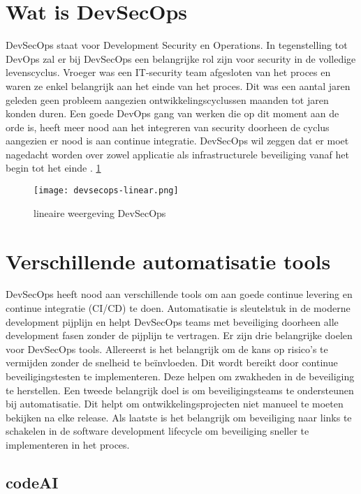\section{Wat is DevSecOps}

DevSecOps staat voor Development Security en Operations. In tegenstelling tot DevOps zal er bij DevSecOps een belangrijke rol zijn voor security in de volledige levenscyclus. Vroeger was een IT-security team afgesloten van het proces en waren ze enkel belangrijk aan het einde van het proces. Dit was een aantal jaren geleden geen probleem aangezien ontwikkelingscyclussen maanden tot jaren konden duren. Een goede DevOps gang van werken die op dit moment aan de orde is, heeft meer nood aan het integreren van security doorheen de cyclus aangezien er nood is aan continue integratie. DevSecOps wil zeggen dat er moet nagedacht worden over zowel applicatie als infrastructurele beveiliging vanaf het begin tot het einde \autocite{RedHat2023}. \ref{fig:linear} 

\begin{figure}[h]
    \centering
    \texttt{[image: devsecops-linear.png]}
    \caption{lineaire weergeving DevSecOps} \autocite{RedHat2023}
    \label{fig:linear}
\end{figure}

\section{Verschillende automatisatie tools}
DevSecOps heeft nood aan verschillende tools om aan goede continue levering en continue integratie (CI/CD) te doen. Automatisatie is sleutelstuk in de moderne development pijplijn en helpt DevSecOps teams met beveiliging doorheen alle development fasen zonder de pijplijn te vertragen. Er zijn drie belangrijke doelen voor DevSecOps tools. Allereerst is het belangrijk om de kans op risico's te vermijden zonder de snelheid te beïnvloeden. Dit wordt bereikt door continue beveiligingstesten te implementeren. Deze helpen om zwakheden in de beveiliging te herstellen. Een tweede belangrijk doel is om beveiligingsteams te ondersteunen bij automatisatie. Dit helpt om ontwikkelingsprojecten niet manueel te moeten bekijken na elke release. Als laatste is het belangrijk om beveiliging naar links te schakelen in de software development lifecycle om beveiliging sneller te implementeren in het proces.\autocite{Tigera2024}

\subsection{codeAI}




